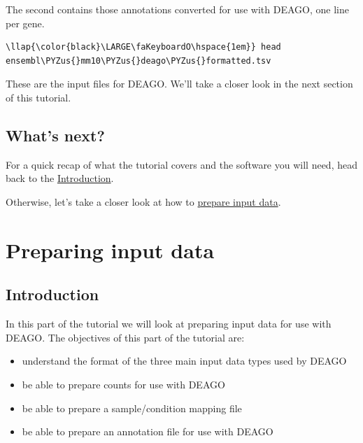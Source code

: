 \documentclass[11pt]{article}
\providecommand{\tightlist}{%
      \setlength{\itemsep}{0pt}\setlength{\parskip}{0pt}}
\def\PYZus{\char`\_}
\begin{document}
    The second contains those annotations converted for use with DEAGO, one
line per gene.

\begin{terminalinput}
\begin{Verbatim}[commandchars=\\\{\}]
\llap{\color{black}\LARGE\faKeyboardO\hspace{1em}} head ensembl\PYZus{}mm10\PYZus{}deago\PYZus{}formatted.tsv
\end{Verbatim}
\end{terminalinput}

    These are the input files for DEAGO. We'll take a closer look in the
next section of this tutorial.

    \hypertarget{whats-next}{%
\subsection{What's next?}\label{whats-next}}

For a quick recap of what the tutorial covers and the software you will
need, head back to the \href{index.ipynb}{Introduction}.

Otherwise, let's take a closer look at how to
\href{input-data.ipynb}{prepare input data}.





\newpage






    \hypertarget{preparing-input-data}{%
\section{Preparing input data}\label{preparing-input-data}}

    \hypertarget{introduction}{%
\subsection{Introduction}\label{introduction}}

In this part of the tutorial we will look at preparing input data for
use with DEAGO. The objectives of this part of the tutorial are:

\begin{itemize}
\tightlist
\item
  understand the format of the three main input data types used by DEAGO
\item
  be able to prepare counts for use with DEAGO
\item
  be able to prepare a sample/condition mapping file
\item
  be able to prepare an annotation file for use with DEAGO
\end{itemize}
\end{document}
